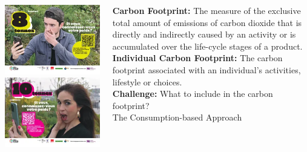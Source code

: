 \documentclass[10pt]{beamer}
\begin{document}
\begin{frame}{\subsecname}
    \begin{columns}
        \begin{column}{0.5\textwidth}
            \includegraphics[width=1\linewidth, height=0.4\textheight]{../Figures/Camp.png}
            \includegraphics[width=1\linewidth, height=0.4\textheight]{../Figures/Camp2.png}
        \end{column}
        \begin{column}{0.5\textwidth}
            \textbf{Carbon Footprint:} The measure of the exclusive total amount of emissions of carbon dioxide that is directly and indirectly caused by an activity or is accumulated over the life-cycle stages of a product. \\
            \textbf{Individual Carbon Footprint:} The carbon footprint associated with an individual’s activities, lifestyle or choices. \\
            \textbf{Challenge:} What to include in the carbon footprint? \\
            The Consumption-based Approach
        \end{column}
    \end{columns}
\end{frame}
\end{document}

